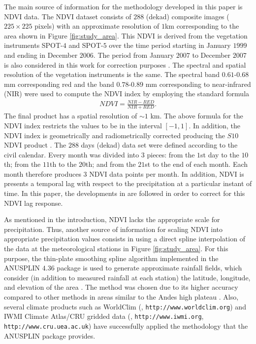 \documentclass[10pt,letterpaper,conference]{ieeeconf}
\begin{document}
The main source of information for the methodology developed in this paper is 
NDVI data. The NDVI dataset consists of $288$ (dekad) composite images 
{($225\times 225$ pixels) with an approximate resolution of $1$km 
corresponding to the area} shown in Figure \ref{fig:study_area}. This NDVI is 
derived from the vegetation instruments SPOT-$4$ and SPOT-$5$ over the time 
period starting in January $1999$ and ending in December $2006$. The period 
from January $2007$ to December $2007$ is also considered in this work for 
correction purposes \cite{Quiroz-et-al_2011}.  The spectral and spatial 
resolution of the vegetation instruments is the same. The spectral band 
$0.61$-$0.68$ mm corresponding red and the band $0.78$-$0.89$ mm corresponding 
to near-infrared (NIR) were used to compute the NDVI index by employing the 
standard formula  
\begin{align} \label{eq:NDVI_definition}
NDVI= \frac{NIR - RED}{NIR + RED}.
\end{align}
The final product has a spatial resolution of $\sim1$ km. The above 
formula for the NDVI index restricts the values to be in the interval 
$[-1,1]$. In addition, the NDVI index is geometrically and radiometrically 
corrected producing the $S10$ NDVI product \cite{Immerzeel-et-al_2005}. The 
$288$ days (dekad) data set were defined according to the civil 
calendar. Every month was divided into $3$ pieces: from the $1$st day to the 
$10$th; from the $11$th to the $20$th; and from the $21$st to the end of each 
month. Each month therefore produces $3$ NDVI data points per month. In 
addition, NDVI is presents a temporal lag with respect to the precipitation at 
a particular instant of time. In this paper, the developments in 
\cite{Immerzeel-et-al_2005, Duffaut-et-al_2017} are followed in order to 
correct for this NDVI lag response. 


As mentioned in the introduction, NDVI lacks the appropriate scale for 
precipitation. Thus, another source of information for scaling 
NDVI into appropriate precipitation values consists in using a direct spline 
interpolation of the data at the meteorological stations in Figure 
\ref{fig:study_area}. For this purpose, the thin-plate smoothing spline 
algorithm implemented in the
ANUSPLIN $4.36$ package  \cite{Hutchinson_2006,ANUSP_07} is used to generate 
approximate rainfall fields, which consider (in addition to measured rainfall 
at each station) the latitude, longitude, and elevation of the area 
\cite{Hutchinson_95}. The method was chosen due to its higher accuracy compared 
to other methods in areas similar to the Andes high plateau 
\cite{Hijmans-et-al_2005,Hartkamp-et-al_99,Jarvis-Stuart_2001, 
Price-et-al_2000}. Also, several climate products such as WorldClim 
(\cite{Hijmans-et-al_2005}, 
\texttt{http://www.worldclim.org}) and IWMI Climate 
Atlas/CRU gridded data (\cite{New-et-al_2002}, \texttt{http://www.iwmi.org}, 
\texttt{http://www.cru.uea.ac.uk}) have successfully applied the methodology 
that the ANUSPLIN package provides. 
\end{document}
